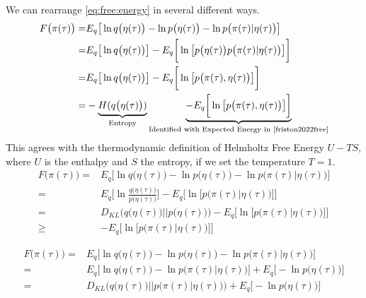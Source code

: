 \documentclass[]{article}
\begin{document}
We can rearrange \eqref{eq:free:energy} in several different ways.
\begin{align*}
	F\big(\pi(\tau)\big) =& E_q\big[\ln q\big(\eta(\tau)\big) - \ln p\big(\eta(\tau)\big) - \ln p\big(\pi(\tau)\vert\eta(\tau)\big)\big]\\
	=& E_q\big[\ln q\big(\eta(\tau)\big)\big] - E_q \bigg[\ln \big[p\big(\eta(\tau)\big)  p\big(\pi(\tau)\vert\eta(\tau)\big)\big]\bigg]\\
	=& E_q\big[\ln q\big(\eta(\tau)\big)\big] - E_q \bigg[\ln \big[  p\big(\pi(\tau),\eta(\tau)\big)\big]\bigg]\\
	=&-\underbrace{H(q\big(\eta(\tau)\big))}_\text{Entropy}  \underbrace{- E_q \bigg[\ln \big[  p\big(\pi(\tau),\eta(\tau)\big)\big]\bigg]}_\text{Identified with Expected Energy in \cite{friston2022free}}
\end{align*}
This agrees with the thermodynamic definition of Helmholtz Free Energy $U-TS$, where $U$ is the enthalpy and $S$ the entropy, if we set the temperature $T=1$.
\begin{align*}
	F\big(\pi(\tau)\big) =& E_q\big[\ln q\big(\eta(\tau)\big) - \ln p\big(\eta(\tau)\big) - \ln p\big(\pi(\tau)\vert\eta(\tau)\big)\big]\\
	=& E_q\big[\ln \frac{q\big(\eta(\tau)\big)}{p\big(\eta(\tau)\big)}   \big] - E_q \bigg[\ln \big[  p\big(\pi(\tau)\vert\eta(\tau)\big)\big]\bigg]\\
	=& D_{KL}\big(q\big(\eta(\tau)\big)\vert\vert p\big(\eta(\tau)\big)\big)- E_q \bigg[\ln \big[  p\big(\pi(\tau)\vert\eta(\tau)\big)\big]\bigg]\\
	\ge&- E_q \bigg[\ln \big[  p\big(\pi(\tau)\vert\eta(\tau)\big)\big]\bigg]
\end{align*}

\begin{align*}
	F\big(\pi(\tau)\big) =& E_q\big[\ln q\big(\eta(\tau)\big) - \ln p\big(\eta(\tau)\big) - \ln p\big(\pi(\tau)\vert\eta(\tau)\big)\big]\\
	=& E_q\big[\ln q\big(\eta(\tau)\big)  - \ln p\big(\pi(\tau)\vert\eta(\tau)\big)\big] +  E_q\big[- \ln p\big(\eta(\tau)\big)\big]\\
	=& D_{KL}\big(q\big(\eta(\tau)\big)\vert\vert p\big(\pi(\tau)\vert\eta(\tau)\big)\big)+  E_q\big[- \ln p\big(\eta(\tau)\big)\big]
\end{align*}
\appendix

\printglossaries




\end{document}
